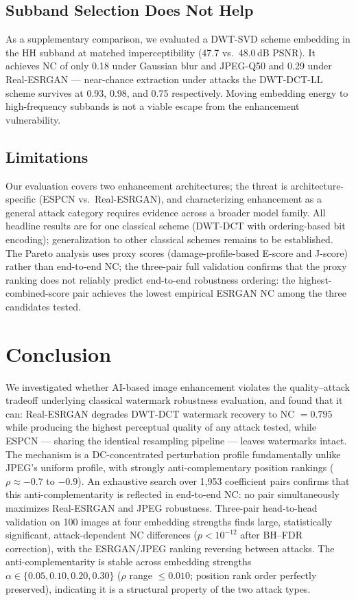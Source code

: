 \documentclass[conference]{IEEEtran}
\begin{document}
\subsection{Subband Selection Does Not Help}
As a supplementary comparison, we evaluated a DWT-SVD scheme embedding
in the HH subband at matched imperceptibility (47.7 vs.\ 48.0\,dB
PSNR). It achieves NC of only 0.18 under Gaussian blur and JPEG-Q50 and
0.29 under Real-ESRGAN --- near-chance extraction under attacks
the DWT-DCT-LL scheme survives at 0.93, 0.98, and 0.75 respectively.
Moving embedding energy to high-frequency subbands is not a viable
escape from the enhancement vulnerability.

\subsection{Limitations}
Our evaluation covers two enhancement architectures; the threat is
architecture-specific (ESPCN vs.\ Real-ESRGAN), and characterizing
enhancement as a general attack category requires evidence across a
broader model family. All headline results are for one classical scheme
(DWT-DCT with ordering-based bit encoding); generalization to other
classical schemes remains to be established. The Pareto analysis uses
proxy scores (damage-profile-based E-score and J-score) rather than
end-to-end NC; the three-pair full validation confirms that the proxy
ranking does not reliably predict end-to-end robustness ordering: the
highest-combined-score pair achieves the lowest empirical ESRGAN NC
among the three candidates tested.

\section{Conclusion}
\label{sec:conclusion}

We investigated whether AI-based image enhancement violates the
quality--attack tradeoff underlying classical watermark robustness
evaluation, and found that it can: Real-ESRGAN degrades DWT-DCT
watermark recovery to NC $= 0.795$ while producing the highest perceptual
quality of any attack tested, while ESPCN --- sharing the identical
resampling pipeline --- leaves watermarks intact. The mechanism is a
DC-concentrated perturbation profile fundamentally unlike JPEG's uniform
profile, with strongly anti-complementary position rankings
($\rho \approx -0.7$ to $-0.9$). An exhaustive search over 1,953
coefficient pairs confirms that this anti-complementarity is reflected
in end-to-end NC: no pair simultaneously maximizes Real-ESRGAN and JPEG
robustness. Three-pair head-to-head validation on 100 images at four
embedding strengths finds large, statistically significant,
attack-dependent NC differences ($p < 10^{-12}$ after BH--FDR correction),
with the ESRGAN/JPEG ranking reversing between attacks. The
anti-complementarity is stable across embedding strengths $\alpha \in
\{0.05, 0.10, 0.20, 0.30\}$ ($\rho$ range $\leq 0.010$; position rank
order perfectly preserved), indicating it is a structural property of
the two attack types.
\end{document}
